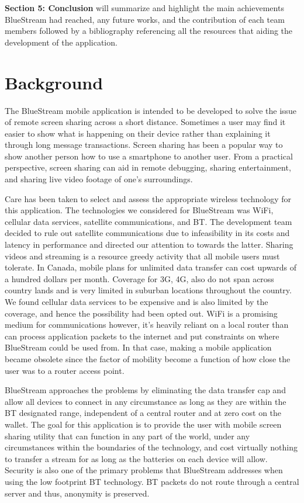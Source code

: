 \documentclass[a4paper,12pt]{article}
\begin{document}
\noindent\textbf{Section 5: Conclusion} will summarize and highlight the main achievements BlueStream had reached, any future works, and the contribution of each team members followed by a bibliography referencing all the resources that aiding the development of the application.



\section{Background}
The BlueStream mobile application is intended to be developed to solve the issue of remote screen sharing across a short distance. Sometimes a user may find it easier to show what is happening on their device rather than explaining it through long message transactions. Screen sharing has been a popular way to show another person how to use a smartphone to another user. From a practical perspective, screen sharing can aid in remote debugging, sharing entertainment, and sharing live video footage of one’s surroundings. 

Care has been taken to select and assess the appropriate wireless technology for this application. The technologies we considered for BlueStream was WiFi, cellular data services, satellite communications, and BT. The development team decided to rule out satellite communications due to infeasibility in its costs and latency in performance and directed our attention to towards the latter. Sharing videos and streaming is a resource greedy activity that all mobile users must tolerate. In Canada, mobile plans for unlimited data transfer can cost upwards of a hundred dollars per month. Coverage for 3G, 4G, also do not span across country lands and is very limited in suburban locations throughout the country. We found cellular data services to be expensive and is also limited by the coverage, and hence the possibility had been opted out. WiFi is a promising medium for communications however, it’s heavily reliant on a local router than can process application packets to the internet and put constraints on where BlueStream could be used from. In that case, making a mobile application became obsolete since the factor of mobility become a function of how close the user was to a router access point.

BlueStream approaches the problems by eliminating the data transfer cap and allow all devices to connect in any circumstance as long as they are within the BT designated range, independent of a central router and at zero cost on the wallet. The goal for this application is to provide the user with mobile screen sharing utility that can function in any part of the world, under any circumstances within the boundaries of the technology, and cost virtually nothing to transfer a stream for as long as the batteries on each device will allow. Security is also one of the primary problems that BlueStream addresses when using the low footprint BT technology. BT packets do not route through a central server and thus, anonymity is preserved. 
\end{document}
